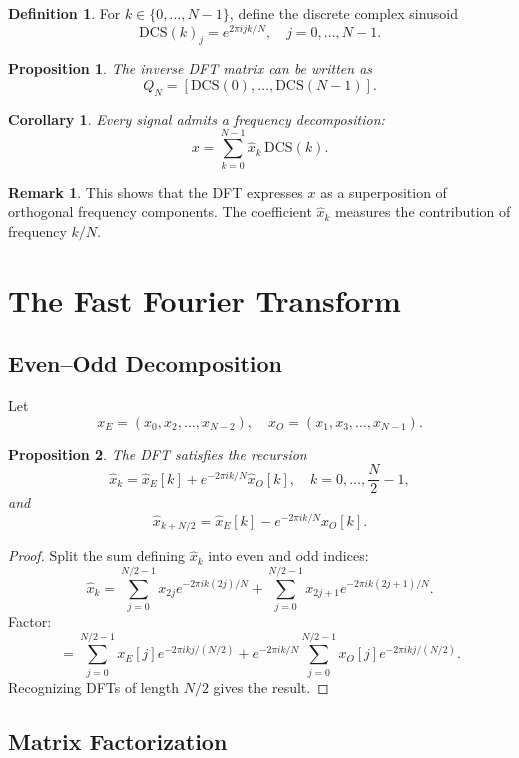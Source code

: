 \documentclass[12pt,oneside]{book}
\numberwithin{equation}{section}
\theoremstyle{definition}
\newtheorem{definition}{Definition}[section]
\newtheorem{remark}{Remark}[section]
\theoremstyle{plain}
\newtheorem{proposition}{Proposition}[section]
\newtheorem{corollary}{Corollary}[section]
\theoremstyle{remark}
\begin{document}
\begin{definition}
For $k \in \{0,\ldots,N-1\}$, define the discrete complex sinusoid
\[
\text{DCS}(k)_j = e^{2\pi i j k / N}, \quad j = 0, \ldots, N-1.
\]
\end{definition}

\begin{proposition}
The inverse DFT matrix can be written as
\[
Q_N = [\text{DCS}(0), \ldots, \text{DCS}(N-1)].
\]
\end{proposition}

\begin{corollary}
Every signal admits a frequency decomposition:
\[
x = \sum_{k=0}^{N-1} \hat{x}_k \, \text{DCS}(k).
\]
\end{corollary}

\begin{remark}
This shows that the DFT expresses $x$ as a superposition of orthogonal frequency components. The coefficient $\hat{x}_k$ measures the contribution of frequency $k/N$.
\end{remark}

\section{The Fast Fourier Transform}

\subsection{Even–Odd Decomposition}

Let
\[
x_E = (x_0, x_2, \ldots, x_{N-2}), \quad
x_O = (x_1, x_3, \ldots, x_{N-1}).
\]

\begin{proposition}
The DFT satisfies the recursion
\[
\hat{x}_k = \hat{x}_E[k] + e^{-2\pi i k/N} \hat{x}_O[k], \quad k = 0, \ldots, \frac{N}{2}-1,
\]
and
\[
\hat{x}_{k+N/2} = \hat{x}_E[k] - e^{-2\pi i k/N} \hat{x}_O[k].
\]
\end{proposition}

\begin{proof}
Split the sum defining $\hat{x}_k$ into even and odd indices:
\[
\hat{x}_k
= \sum_{j=0}^{N/2-1} x_{2j} e^{-2\pi i k(2j)/N}
+ \sum_{j=0}^{N/2-1} x_{2j+1} e^{-2\pi i k(2j+1)/N}.
\]
Factor:
\[
= \sum_{j=0}^{N/2-1} x_E[j] e^{-2\pi i k j/(N/2)}
+ e^{-2\pi i k/N} \sum_{j=0}^{N/2-1} x_O[j] e^{-2\pi i k j/(N/2)}.
\]
Recognizing DFTs of length $N/2$ gives the result.
\end{proof}

\subsection{Matrix Factorization}
\end{document}

